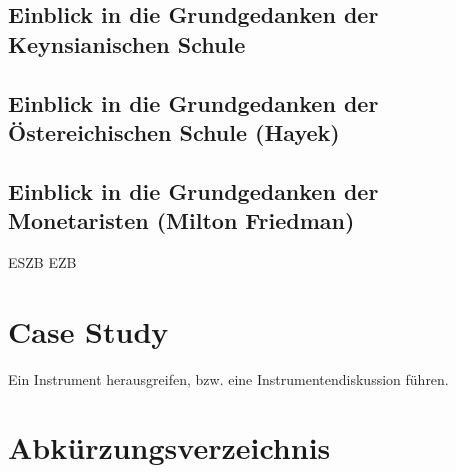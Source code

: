 \documentclass[
onecolumn,
a4paper,
abstracton,
parskip=half
,final
]{scrartcl}
\begin{document}
\subsection{Einblick in die Grundgedanken der Keynsianischen Schule}

\subsection{Einblick in die Grundgedanken der {\"O}stereichischen Schule (Hayek)}

\subsection{Einblick in die Grundgedanken der Monetaristen (Milton Friedman)}


\clearpage
\ac{ESZB}
\ac{EZB}



\section{Case Study}
\label{sec1:caseStudy}
Ein Instrument herausgreifen, bzw. eine Instrumentendiskussion f{\"u}hren.

\subsection{}
\subsection{}
\subsection{}



\clearpage

\section{Abk{\"u}rzungsverzeichnis}


\begin{acronym}[ESZB]


\end{acronym}


\vspace{10pt}
	\newpage
\singlespacing



\newpage





%
\end{document}
